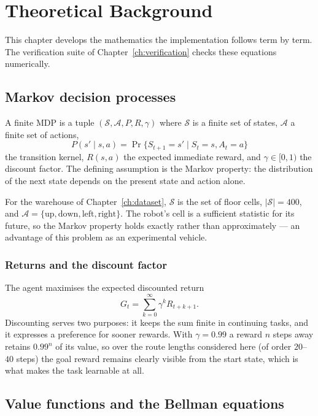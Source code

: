 \chapter{Theoretical Background}
\label{ch:theory}

This chapter develops the mathematics the implementation follows term by term. The verification
suite of Chapter~\ref{ch:verification} checks these equations numerically.

\section{Markov decision processes}

A finite MDP is a tuple $(\mathcal{S}, \mathcal{A}, P, R, \gamma)$ where $\mathcal{S}$ is a finite
set of states, $\mathcal{A}$ a finite set of actions,
\begin{equation}
P(s' \mid s,a) = \Pr\{S_{t+1} = s' \mid S_t = s, A_t = a\}
\end{equation}
the transition kernel, $R(s,a)$ the expected immediate reward, and $\gamma \in [0,1)$ the discount
factor. The defining assumption is the Markov property: the distribution of the next state depends
on the present state and action alone.

For the warehouse of Chapter~\ref{ch:dataset}, $\mathcal{S}$ is the set of floor cells,
$|\mathcal{S}| = 400$, and $\mathcal{A} = \{\text{up}, \text{down}, \text{left}, \text{right}\}$.
The robot's cell is a sufficient statistic for its future, so the Markov property holds exactly
rather than approximately --- an advantage of this problem as an experimental vehicle.

\subsection{Returns and the discount factor}

The agent maximises the expected discounted return
\begin{equation}
G_t = \sum_{k=0}^{\infty} \gamma^{k} R_{t+k+1}.
\end{equation}
Discounting serves two purposes: it keeps the sum finite in continuing tasks, and it expresses a
preference for sooner rewards. With $\gamma = 0.99$ a reward $n$ steps away retains $0.99^{n}$ of
its value, so over the route lengths considered here (of order $20$--$40$ steps) the goal reward
remains clearly visible from the start state, which is what makes the task learnable at all.

\section{Value functions and the Bellman equations}

